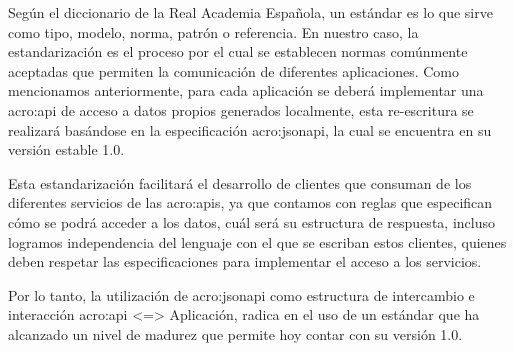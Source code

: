Según el diccionario de la Real Academia Española,  un estándar es lo que sirve como tipo, modelo, norma, patrón o referencia.  En nuestro caso, la estandarización es el proceso por el cual se establecen normas comúnmente aceptadas que permiten la comunicación de diferentes aplicaciones.
Como mencionamos anteriormente, para cada aplicación se deberá implementar una \gls{acro:api} de acceso a datos propios generados localmente, esta re-escritura se realizará basándose en la especificación \gls{acro:jsonapi}, la cual se encuentra en su versión estable 1.0.

Esta estandarización facilitará el desarrollo de clientes que consuman de los diferentes servicios de las \glspl{acro:api}, ya que contamos con reglas que especifican cómo se podrá acceder a los datos, cuál será su estructura de respuesta, incluso logramos independencia del lenguaje con el que se escriban estos clientes, quienes deben respetar las especificaciones para implementar el acceso a los servicios.

Por lo tanto, la utilización de \gls{acro:jsonapi} como estructura de intercambio e interacción \gls{acro:api} <=> Aplicación, radica en el uso de un estándar que ha alcanzado un nivel de madurez que permite hoy contar con su versión 1.0.
